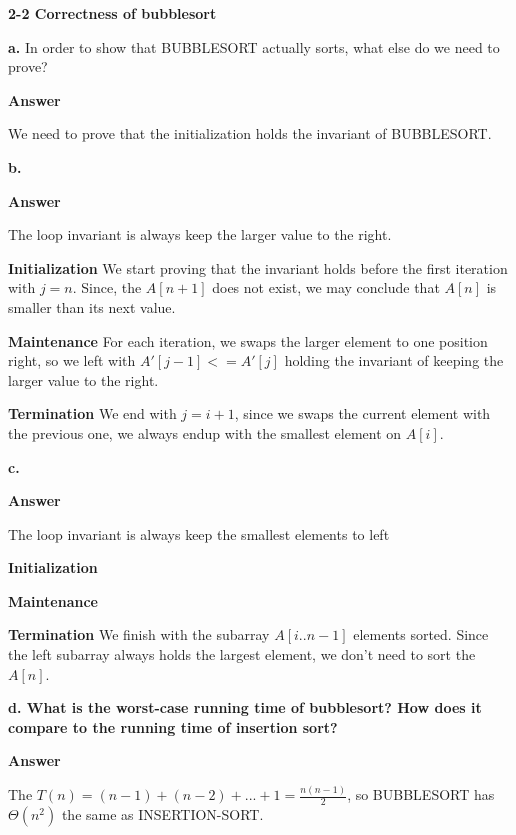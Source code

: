 \documentclass[11pt]{article}          %
\begin{document}

\textbf{2-2 Correctness of bubblesort}

\textbf{a.} In order to show that BUBBLESORT actually sorts, what else do we need to prove?

\textbf{Answer}

We need to prove that the initialization holds the invariant of BUBBLESORT.

\textbf{b.} 

\textbf{Answer}

The loop invariant is always keep the larger value to the right.

\textbf{Initialization} We start proving that the invariant holds before the first iteration
with $j = n$. Since, the $A[n+1]$ does not exist, we may conclude that $A[n]$ is smaller than
its next value.

\textbf{Maintenance} For each iteration, we swaps the larger element to one position right,
so we left with $A'[j-1] <= A'[j]$ holding the invariant of keeping the larger value to the
right.

\textbf{Termination} We end with $j = i + 1$, since we swaps the current element with the
previous one, we always endup with the smallest element on $A[i]$.

\textbf{c.} 

\textbf{Answer}

The loop invariant is always keep the smallest elements to left

\textbf{Initialization} 

\textbf{Maintenance} 

\textbf{Termination} We finish with the subarray $A[i..n-1]$ elements sorted. Since the left
subarray always holds the largest element, we don't need to sort the $A[n]$.

\textbf{d. What is the worst-case running time of bubblesort? How does it compare to the running
time of insertion sort?}

\textbf{Answer}

The $T(n) = (n - 1) + (n - 2) + ... + 1 = \frac{n(n - 1)}{2}$, so BUBBLESORT has $\Theta (n^2)$ the
same as INSERTION-SORT.
\end{document}
